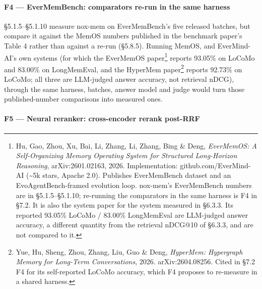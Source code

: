 \documentclass[
]{article}
\begin{document}
\paragraph{F4 --- EverMemBench: comparators re-run in the same
harness}\label{f4-evermembench-comparators-re-run-in-the-same-harness}

§5.1.5--§5.1.10 measure nox-mem on EverMemBench's five released batches,
but compare it against the MemOS numbers published in the benchmark
paper's Table 4 rather than against a re-run (§5.8.5). Running MemOS,
and EverMind-AI's own systems (for which the EverMemOS paper\footnote{Hu,
  Gao, Zhou, Xu, Bai, Li, Zhang, Li, Zhang, Bing \& Deng,
  \emph{EverMemOS: A Self-Organizing Memory Operating System for
  Structured Long-Horizon Reasoning}, arXiv:2601.02163, 2026.
  Implementation: github.com/EverMind-AI (\textasciitilde5k stars,
  Apache 2.0). Publishes EverMemBench dataset and an
  EvoAgentBench-framed evolution loop. nox-mem's EverMemBench numbers
  are in §5.1.5--§5.1.10; re-running the comparators in the same harness
  is F4 in §7.2. It is also the system paper for the system measured in
  §6.3.3. Its reported 93.05\% LoCoMo / 83.00\% LongMemEval are
  LLM-judged answer accuracy, a different quantity from the retrieval
  nDCG@10 of §6.3.3, and are not compared to it.} reports 93.05\% on
LoCoMo and 83.00\% on LongMemEval, and the HyperMem paper\footnote{Yue,
  Hu, Sheng, Zhou, Zhang, Liu, Guo \& Deng, \emph{HyperMem: Hypergraph
  Memory for Long-Term Conversations}, 2026. arXiv:2604.08256. Cited in
  §7.2 F4 for its self-reported LoCoMo accuracy, which F4 proposes to
  re-measure in a shared harness.} reports 92.73\% on LoCoMo; all three
are LLM-judged answer accuracy, not retrieval nDCG), through the same
harness, batches, answer model and judge would turn those
published-number comparisons into measured ones.

\paragraph{F5 --- Neural reranker: cross-encoder rerank
post-RRF}\label{f5-neural-reranker-cross-encoder-rerank-post-rrf}
\end{document}
